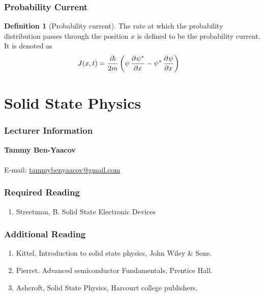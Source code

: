 \documentclass[titlepage, fleqn, a4paper, 12pt, twoside]{article}
\theoremstyle{definition}
\newtheorem{definition}{Definition}
\theoremstyle{theorem}
\begin{document}
\section{Probability Current}

\begin{definition}[Probability current]
	The rate at which the probability distribution passes through the position $x$ is defined to be the probability current.
	It is denoted as
	\begin{align*}
		J(x,t) &= \frac{i \hbar}{2 m} \left( \psi \dpd{\psi^*}{x} - \psi^* \dpd{\psi}{x} \right)
	\end{align*}
\end{definition}

\newpage
\part{Solid State Physics}

\section{Lecturer Information}

\textbf{Tammy Ben-Yaacov}\\
~\\
E-mail: \href{mailto:tammybenyaacov@gmail.com}{tammybenyaacov@gmail.com}\\

\section{Required Reading}

\begin{enumerate}
	\item Streetman, B. Solid State Electronic Devices
\end{enumerate}

\section{Additional Reading}

\begin{enumerate}
	\item Kittel, Introduction to solid state physics, John Wiley \& Sons.
	\item Pierret. Advanced semiconductor Fundamentals, Prentice Hall.
	\item Ashcroft, Solid State Physics, Harcourt college publishers.
\end{enumerate}
\end{document}
